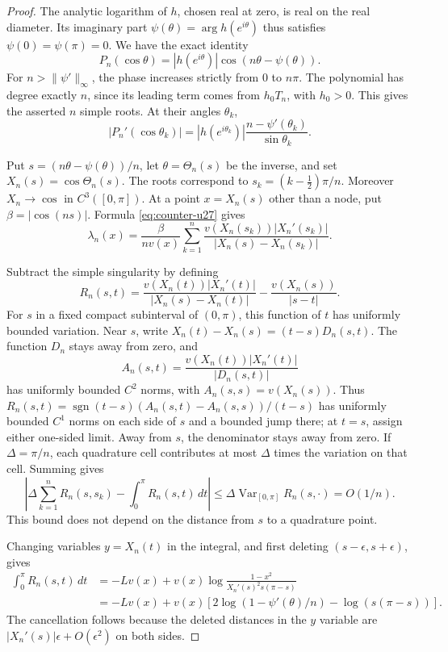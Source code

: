 \documentclass[11pt]{article}
\theoremstyle{remark}
\numberwithin{equation}{section}
\begin{document}
\begin{proof} The analytic logarithm of \(h\), chosen real at zero, is real on the real diameter. Its imaginary part
\(\psi(\theta)=\arg h(e^{i\theta})\) thus satisfies \(\psi(0)=\psi(\pi)=0\). We have the exact identity
\[
 P_n(\cos\theta)=|h(e^{i\theta})|\cos(n\theta-\psi(\theta)).
\]
For \(n>\|\psi'\|_\infty\), the phase increases strictly from \(0\) to \(n\pi\). The polynomial has degree exactly \(n\), since its leading term comes from \(h_0T_n\), with \(h_0>0\). This gives the asserted \(n\) simple roots. At their angles \(\theta_k\),
\begin{equation}\label{eq:counter-u27}
|P_n'(\cos\theta_k)|
 =|h(e^{i\theta_k})|
       \frac{n-\psi'(\theta_k)}{\sin\theta_k}.
\end{equation}

Put \(s=(n\theta-\psi(\theta))/n\), let \(\theta=\Theta_n(s)\) be the inverse, and set \(X_n(s)=\cos\Theta_n(s)\). The roots correspond to
\(s_k=(k-\tfrac12)\pi/n\). Moreover \(X_n\to\cos\) in \(C^3([0,\pi])\). At a point \(x=X_n(s)\) other than a node, put \(\beta=|\cos(ns)|\). Formula \eqref{eq:counter-u27} gives
\begin{equation}\label{eq:counter-u28}
\lambda_n(x)=\frac{\beta}{nv(x)}
  \sum_{k=1}^n
  \frac{v(X_n(s_k))|X_n'(s_k)|}{|X_n(s)-X_n(s_k)|}.
\end{equation}

Subtract the simple singularity by defining
\[
 R_n(s,t)=
 \frac{v(X_n(t))|X_n'(t)|}{|X_n(s)-X_n(t)|}
 -\frac{v(X_n(s))}{|s-t|}.
\]
For \(s\) in a fixed compact subinterval of \((0,\pi)\), this function
of \(t\) has uniformly bounded variation. Near \(s\), write
\(X_n(t)-X_n(s)=(t-s)D_n(s,t)\). The function \(D_n\) stays away
from zero, and
\[
 A_n(s,t)=\frac{v(X_n(t))|X_n'(t)|}{|D_n(s,t)|}
\]
has uniformly bounded \(C^2\) norms, with \(A_n(s,s)=v(X_n(s))\).
Thus \(R_n(s,t)=\operatorname{sgn}(t-s)
(A_n(s,t)-A_n(s,s))/(t-s)\) has uniformly bounded \(C^1\) norms
on each side of \(s\) and a bounded jump there; at \(t=s\), assign
either one-sided limit. Away from \(s\),
the denominator stays away from zero. If \(\Delta=\pi/n\), each
quadrature cell contributes at most \(\Delta\) times the variation
on that cell. Summing gives
\[
 \left|\Delta\sum_{k=1}^n R_n(s,s_k)
       -\int_0^\pi R_n(s,t)\,dt\right|
 \le \Delta\operatorname{Var}_{[0,\pi]}R_n(s,\cdot)=O(1/n).
\]
This bound does not depend on the distance from \(s\) to a
quadrature point.

Changing variables \(y=X_n(t)\) in the integral, and first deleting \((s-\epsilon,s+\epsilon)\), gives
\begin{equation}\label{eq:counter-u29}
\begin{split}
 \int_0^\pi R_n(s,t)\,dt
 &=-Lv(x)+v(x)
   \log\frac{1-x^2}{X_n'(s)^2s(\pi-s)}\\
 &=-Lv(x)+v(x)\left[
  2\log(1-\psi'(\theta)/n)-\log(s(\pi-s))\right].
\end{split}
\end{equation}
The cancellation follows because the deleted distances in the \(y\) variable are
\(|X_n'(s)|\epsilon+O(\epsilon^2)\) on both sides.


\end{proof}
\end{document}
